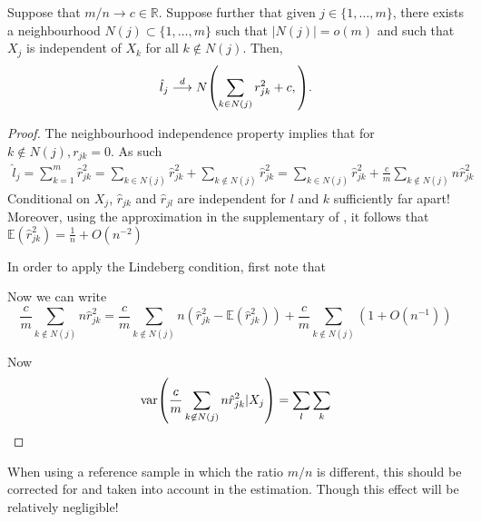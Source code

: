 \begin{proposition}
	Suppose that $ m/n \rightarrow c \in \mathbb{R} $. Suppose further that given $ j \in \lbrace 1, \dots, m\rbrace $, there exists a neighbourhood $ N(j) \subset \lbrace 1, \dots, m\rbrace $ such that $ |N(j)| = o(m) $ and such that $ X_j $ is independent of $ X_k $ for all $ k \not\in N(j) $. Then,
	\begin{equation*}
		\hat{l}_j \convd N\left(\sum_{k \in N(j)} r^2_{jk} + c, \right).
	\end{equation*}
\end{proposition}
\begin{proof}
	The neighbourhood independence property implies that for $ k \not\in N(j), r_{jk} = 0 $. As such
	\begin{align*}
		\hat{l}_j = \sum_{k = 1}^m \hat{r}^2_{jk} = \sum_{k \in N(j)} \hat{r}^2_{jk} + \sum_{k \not\in N(j)} \hat{r}^2_{jk} =  \sum_{k \in N(j)} \hat{r}^2_{jk} + \frac{c}{m}\sum_{k \not\in N(j)} n\hat{r}^2_{jk}
	\end{align*}
	Conditional on $ X_j $, $ \hat{r}_{jk} $ and $ \hat{r}_{jl} $ are independent for $ l $ and $ k $ sufficiently far apart! Moreover, using the approximation in the supplementary of \cite{Bulik2015}, it follows that $ \mathbb{E}(\hat{r}^2_{jk}) = \frac{1}{n} + O(n^{-2}) $
	
	In order to apply the Lindeberg condition, first note that 
	
	Now we can write 
	\begin{equation*}
		\frac{c}{m}\sum_{k \not\in N(j)} n\hat{r}^2_{jk} = 	\frac{c}{m}\sum_{k \not\in N(j)} n\left(\hat{r}^2_{jk} - \mathbb{E}(\hat{r}^2_{jk})\right) + \frac{c}{m}\sum_{k \not\in N(j)} \left(1 + O(n^{-1})\right)
	\end{equation*}
	
	Now 
	\begin{equation*}
	\var\left(\frac{c}{m}\sum_{k \not\in N(j)} n\hat{r}^2_{jk} | X_j\right) = \sum_l \sum_k 
	\end{equation*}
	
	
\end{proof}

When using a reference sample in which the ratio $ m/n $ is different, this should be corrected for and taken into account in the estimation. Though this effect will be relatively negligible!



